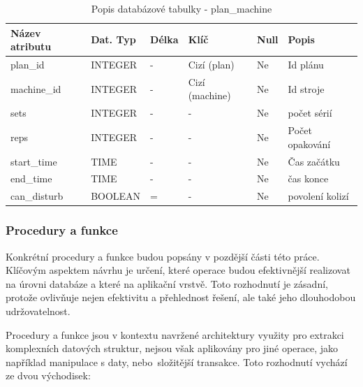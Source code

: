 \begin{table}[h!]
	\caption{Popis databázové tabulky - plan\_machine}
    \label{tab:dat-dictionary-plan-machine}
	\begin{tabular}{|p{3.5cm}|p{2cm}|p{1cm}|p{2.5cm}|p{.75cm}|p{3.75cm}|}
		\hline
        \textbf{Název atributu} & \textbf{Dat. Typ} & \textbf{Délka} & \textbf{Klíč} & \textbf{Null} & \textbf{Popis} \\
        \hline
            plan\_id        & INTEGER   &  -    & Cizí (plan)       & Ne & Id plánu \\
        \hline
            machine\_id     & INTEGER   &  -    & Cizí (machine)       & Ne & Id stroje \\
        \hline
            sets                & INTEGER   &  -   & -                 & Ne & počet sérií\\
        \hline
            reps                & INTEGER   &  -    & -                 & Ne &  Počet opakování \\
        \hline
            start\_time     & TIME      &  -    & -                 & Ne & Čas začátku \\
        \hline
            end\_time       & TIME      &  -    & -                 & Ne & čas konce \\
        \hline
            can\_disturb          & BOOLEAN   &  =    & -                 & Ne & povolení kolizí \\
        \hline
	\end{tabular}
\end{table}

\subsubsection{Procedury a funkce}
Konkrétní procedury a funkce budou popsány v pozdější části této práce. Klíčovým aspektem návrhu je určení, které operace budou efektivnější realizovat na úrovni databáze a které na aplikační vrstvě. Toto rozhodnutí je zásadní, protože ovlivňuje nejen efektivitu a přehlednost řešení, ale také jeho dlouhodobou udržovatelnost.

Procedury a funkce jsou v kontextu navržené architektury využity pro extrakci komplexních datových struktur, nejsou však aplikovány pro jiné operace, jako například manipulace s daty, nebo~složitější transakce. Toto rozhodnutí vychází ze dvou východisek:

